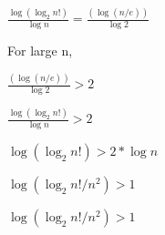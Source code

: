\documentclass[a4paper]{article}
\begin{document}
\begin{enumerate}[label=(\alph*)]
\begin{center}
    $ \frac{\log(\log_2 n!)}{\log n} = \frac{(\log (n/e))}{\log 2}$
\end{center}

\begin{center}
    For large n, 
\end{center}

\begin{center}
    $\frac{(\log (n/e))}{\log 2} > 2$  
\end{center}

\begin{center}
    $\frac{\log(\log_2 n!)}{\log n} > 2$
\end{center}

\begin{center}
    $\log(\log_2 n!) > 2*\log n$
\end{center}

\begin{center}
    $\log(\log_2 n!/n^2) > 1$
\end{center}

\begin{center}
    $\log(\log_2 n!/n^2) > 1$
\end{center}


\end{enumerate}
\end{document}
